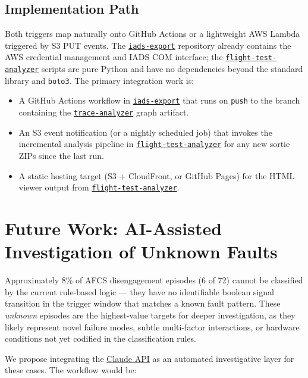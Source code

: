 \documentclass[11pt, letterpaper]{article}
\newcommand{\repoFTA}{\href{https://github.com/francis-barchesky/flight-test-analyzer}{\texttt{flight-test-analyzer}}}
\newcommand{\repoIADS}{\href{https://github.com/merlinlabs/iads-export}{\texttt{iads-export}}}
\newcommand{\repoTrace}{\href{https://github.com/francis-barchesky/trace-analyzer}{\texttt{trace-analyzer}}}
\begin{document}
\subsection{Implementation Path}

Both triggers map naturally onto GitHub Actions or a lightweight AWS Lambda
triggered by S3 PUT events. The \repoIADS{} repository already contains the
AWS credential management and IADS COM interface; the \repoFTA{} scripts are
pure Python and have no dependencies beyond the standard library and
\texttt{boto3}. The primary integration work is:
\begin{itemize}[itemsep=2pt]
  \item A GitHub Actions workflow in \repoIADS{} that runs on \texttt{push}
    to the branch containing the \repoTrace{} graph artifact.
  \item An S3 event notification (or a nightly scheduled job) that invokes the
    incremental analysis pipeline in \repoFTA{} for any new sortie ZIPs since
    the last run.
  \item A static hosting target (S3 + CloudFront, or GitHub Pages) for the
    HTML viewer output from \repoFTA{}.
\end{itemize}

\section{Future Work: AI-Assisted Investigation of Unknown Faults}
\label{sec:future}

Approximately 8\% of AFCS disengagement episodes (6 of 72) cannot be
classified by the current rule-based logic --- they have no identifiable
boolean signal transition in the trigger window that matches a known fault
pattern. These \emph{unknown} episodes are the highest-value targets for
deeper investigation, as they likely represent novel failure modes, subtle
multi-factor interactions, or hardware conditions not yet codified in the
classification rules.

We propose integrating the \href{https://docs.anthropic.com/en/api/getting-started}{Claude API}
as an automated investigative layer for these cases. The workflow would be:
\end{document}
